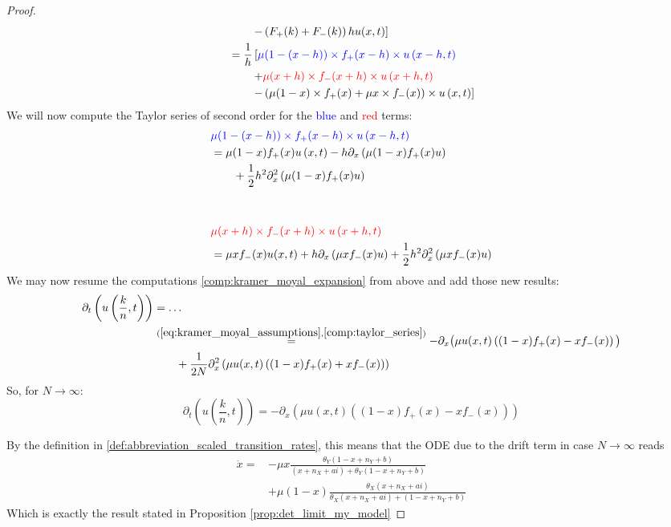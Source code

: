 \documentclass[12pt,a4paper,twoside]{article}
\begin{document}
\begin{proof}
\begin{align}
\begin{split}
	&\qquad\left. - \left(F_+(k)+F_-(k)\right)hu(x,t)\right]\\
	&= \frac{1}{h}\left[\textcolor{blue}{\mu(1-(x-h))\times f_+(x-h) \times u\left(x-h,t \right)}\right.\\
	&\qquad\left. + \textcolor{red}{\mu(x+h)\times f_-(x+h)\times u\left(x+h,t\right)}\right.\\
	&\qquad\left.- \left(\mu(1-x)\times f_+(x) + \mu x\times f_-(x)\right)\times u\left(x,t\right)\right] 
	\end{split}
	\end{align}
	We will now compute the Taylor series of second order for the \textcolor{blue}{blue} and \textcolor{red}{red} terms:
	\begin{align}\label{comp:taylor_series}
	\begin{split}
	&\textcolor{blue}{\mu(1-(x-h))\times f_+(x-h) \times u\left(x-h,t \right)}\\
	&= \mu(1-x)f_+(x) u\left(x,t\right) - h\partial_x \left(\mu(1-x)f_+(x)u\right)\\
	&\qquad +\frac{1}{2}h^2\partial^2_x\left(\mu(1-x)f_+(x)u\right)\\
	&\\
	&\\
	&\textcolor{red}{\mu(x+h)\times f_-(x+h) \times u\left(x+h,t\right)} \\
	&= \mu x f_-(x)u(x,t) + h\partial_x \left(\mu x f_-(x) u\right) + \frac{1}{2}h^2\partial^2_x\left(\mu xf_-(x) u\right)
	\end{split}
	\end{align}
	We may now resume the computations \eqref{comp:kramer_moyal_expansion} from above and add those new results:
	\begin{align*}
	\partial_t \left(u\left(\frac{k}{n}, t\right)\right) &= \dots \\
	&\overset{(\ref{eq:kramer_moyal_assumptions}, \ref{comp:taylor_series})}{=} -\partial_x\big(\mu u(x,t)\left((1-x)f_+(x) - xf_-(x)\right)\big)\\
	&\qquad + \frac{1}{2N} \partial^2_x\left(\mu u(x,t)\left((1-x)f_+(x) + xf_-(x)\right)\right)\\
	\end{align*}
	So, for $N \rightarrow \infty$:
	\begin{equation}
	\partial_t \left(u\left(\frac{k}{n}, t\right)\right) = -\partial_x\left(\mu u(x,t)\left((1-x)f_+(x) - xf_-(x)\right)\right)
	\end{equation}
	
	By the definition in \eqref{def:abbreviation_scaled_transition_rates}, this means that the ODE due to the drift term in case $N \rightarrow \infty$ reads 
	\begin{align*}
	\dot{x} = &-\mu x\frac{\theta_Y(1-x+n_Y+b)}{(x+n_X+ai) + \theta_Y(1-x+n_Y+b)}\\
	\qquad&+ \mu \left(1-x\right)\frac{\theta_X (x+ n_X+ ai)}{\theta_X (x + n_X + ai) + (1-x + n_Y + b)}
	\end{align*}
	Which is exactly the result stated in Proposition \ref{prop:det_limit_my_model}
\end{proof}
\end{document}

